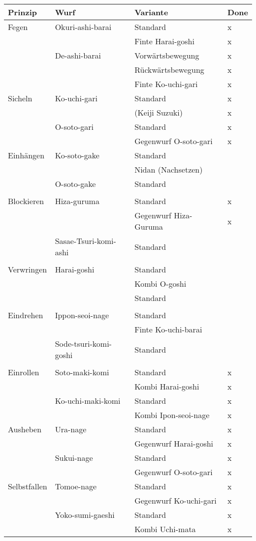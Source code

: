 \documentclass[justified, a4paper, notitlepage, captions=tableheading, nobib]{tufte-handout}
\begin{document}
\begin{center}
\begin{tabular}{llll}
Prinzip & Wurf & Variante & Done\\
\hline
Fegen & Okuri-ashi-barai & Standard & x\\
 &  & Finte Harai-goshi & x\\
 & De-ashi-barai & Vorwärtsbewegung & x\\
 &  & Rückwärtsbewegung & x\\
 &  & Finte Ko-uchi-gari & x\\
Sicheln & Ko-uchi-gari & Standard & x\\
 &  & (Keiji Suzuki) & x\\
 & O-soto-gari & Standard & x\\
 &  & Gegenwurf O-soto-gari & x\\
Einhängen & Ko-soto-gake & Standard & \\
 &  & Nidan (Nachsetzen) & \\
 & O-soto-gake & Standard & \\
 &  &  & \\
Blockieren & Hiza-guruma & Standard & x\\
 &  & Gegenwurf Hiza-Guruma & x\\
 & Sasae-Tsuri-komi-ashi & Standard & \\
 &  &  & \\
Verwringen & Harai-goshi & Standard & \\
 &  & Kombi O-goshi & \\
 &  & Standard & \\
 &  &  & \\
Eindrehen & Ippon-seoi-nage & Standard & \\
 &  & Finte Ko-uchi-barai & \\
 & Sode-tsuri-komi-goshi & Standard & \\
 &  &  & \\
Einrollen & Soto-maki-komi & Standard & x\\
 &  & Kombi Harai-goshi & x\\
 & Ko-uchi-maki-komi & Standard & x\\
 &  & Kombi Ipon-seoi-nage & x\\
Ausheben & Ura-nage & Standard & x\\
 &  & Gegenwurf Harai-goshi & x\\
 & Sukui-nage & Standard & x\\
 &  & Gegenwurf O-soto-gari & x\\
Selbstfallen & Tomoe-nage & Standard & x\\
 &  & Gegenwurf Ko-uchi-gari & x\\
 & Yoko-sumi-gaeshi & Standard & x\\
 &  & Kombi Uchi-mata & x\\
\end{tabular}
\end{center}
\end{document}
